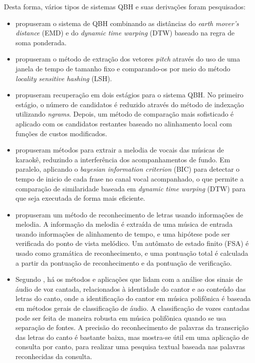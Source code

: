 Desta forma, vários tipos de sistemas QBH e suas derivações foram pesquisados:
\begin{itemize}
    \item {} propuseram o sistema de QBH combinando as distâncias do \textit{earth mover’s distance} (EMD) e do \textit{dynamic time warping} (DTW) baseado na regra de soma ponderada.
    \item {} propuseram o método de extração dos vetores \textit{pitch} através do uso de uma janela de tempo de tamanho fixo e comparando-os por meio do método \textit{locality sensitive hashing} (LSH).
    \item {} propuseram recuperação em dois estágios para o sistema QBH. No primeiro estágio, o número de candidatos é reduzido através do método de indexação utilizando \textit{ngrams}. Depois, um método de comparação mais sofisticado é aplicado com os candidatos restantes baseado no alinhamento local com funções de custos modificados.
    \item {} propuseram métodos para extrair a melodia de vocais das músicas de karaokê, reduzindo a interferência dos acompanhamentos de fundo. Em paralelo, aplicando o \textit{bayesian information criterion} (BIC) para detectar o tempo de inicio de cada frase no canal vocal acompanhado, o que permite a comparação de similaridade baseada em \textit{dynamic time warping} (DTW) para que seja executada de forma mais eficiente.
    \item {} propuseram um método de reconhecimento de letras usando informações de melodia. A informação da melodia é extraída de uma música de entrada usando informações de alinhamento de tempo, e uma hipótese pode ser verificada do ponto de vista melódico. Um autômato de estado finito (FSA) é usado como gramática de reconhecimento, e uma pontuação total é calculada a partir da pontuação de reconhecimento e da pontuação de verificação.
    \item Segundo , há os métodos e aplicações que lidam com a análise dos sinais de áudio de voz cantada, relacionados à identidade do cantor e ao conteúdo das letras do canto, onde a identificação do cantor em música polifônica é baseada em métodos gerais de classificação de áudio. A classificação de vozes cantadas pode ser feita de maneira robusta em música polifônica quando se usa separação de fontes. A precisão do reconhecimento de palavras da transcrição das letras do canto é bastante baixa, mas mostra-se útil em uma aplicação de consulta por canto, para realizar uma pesquisa textual baseada nas palavras reconhecidas da consulta.
\end{itemize}

